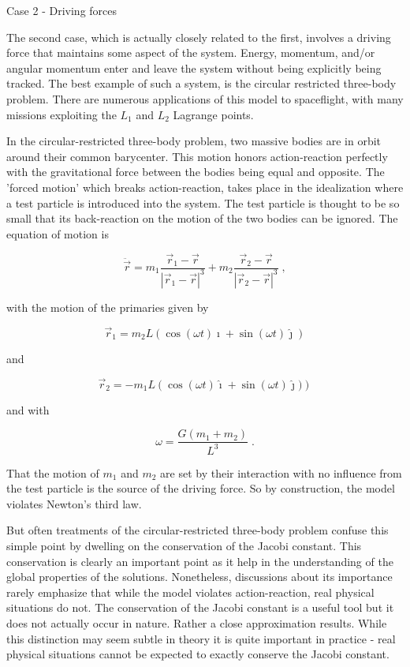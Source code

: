 \documentclass[12pt]{article}
\begin{document}
Case 2 - Driving forces

The second case, which is actually closely related to the first, involves a driving force that maintains some aspect of the system.  Energy, momentum, and/or angular momentum enter and leave the system without being explicitly being tracked.  The best example of such a system, is the circular restricted three-body problem.  There are numerous applications of this model to spaceflight, with many missions exploiting the $L_1$ and $L_2$ Lagrange points.

In the circular-restricted three-body problem, two massive bodies are in orbit around their common barycenter.  This motion honors action-reaction perfectly with the gravitational force between the bodies being equal and opposite.  The 'forced motion' which breaks action-reaction, takes place in the idealization where a test particle is introduced into the system.  The test particle is thought to be so small that its back-reaction on the motion of the two bodies can be ignored.  The equation of motion is

\[  \ddot {\vec r} = m_1 \frac{\vec r_1 - \vec r}{|\vec r_1 - \vec r|^3} + m_2 \frac{\vec r_2 - \vec r}{|\vec r_2 - \vec r|^3} \; ,\]

with the motion of the primaries given by 

\[ \vec r_1 = m_2 L \left( \cos(\omega t) \hat \imath + \sin(\omega t) \hat \jmath \right) \]

and 

\[ \vec r_2 = -m_1 L \left( \cos(\omega t) \hat \imath + \sin(\omega t) \hat \jmath ) \right) \]

and with

\[ \omega = \frac{G(m_1 + m_2)}{L^3} \; . \]

That the motion of $m_1$ and $m_2$ are set by their interaction with no influence from the test particle is the source of the driving force.  So by construction, the model violates Newton's third law.    

But often treatments of the circular-restricted three-body problem confuse this simple point by dwelling on the conservation of the Jacobi constant.  This conservation is clearly an important point as it help in the understanding of the global properties of the solutions.  Nonetheless, discussions about its importance rarely emphasize that while the model violates action-reaction, real physical situations do not.  The conservation of the Jacobi constant is a useful tool but it does not actually occur in nature.  Rather a close approximation results.  While this distinction may seem subtle in theory it is quite important in practice - real physical situations cannot be expected to exactly conserve the Jacobi constant.
\end{document}
